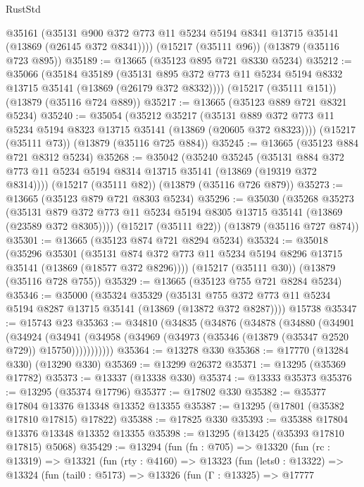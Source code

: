 \begin{lexlean}{RustStd}
\begin{coremodule}
      @35161
      (@35131 @900 @372 @773 @11 @5234 @5194 @8341 @13715 @35141 (@13869 (@26145 @372 @8341))))
    (@15217 (@35111 @96))
    (@13879 (@35116 @723 @895))
@35189 := @13665 (@35123 @895 @721 @8330 @5234)
@35212 := @35066
    (@35184
      @35189
      (@35131 @895 @372 @773 @11 @5234 @5194 @8332 @13715 @35141 (@13869 (@26179 @372 @8332))))
    (@15217 (@35111 @151))
    (@13879 (@35116 @724 @889))
@35217 := @13665 (@35123 @889 @721 @8321 @5234)
@35240 := @35054
    (@35212
      @35217
      (@35131 @889 @372 @773 @11 @5234 @5194 @8323 @13715 @35141 (@13869 (@20605 @372 @8323))))
    (@15217 (@35111 @73))
    (@13879 (@35116 @725 @884))
@35245 := @13665 (@35123 @884 @721 @8312 @5234)
@35268 := @35042
    (@35240
      @35245
      (@35131 @884 @372 @773 @11 @5234 @5194 @8314 @13715 @35141 (@13869 (@19319 @372 @8314))))
    (@15217 (@35111 @82))
    (@13879 (@35116 @726 @879))
@35273 := @13665 (@35123 @879 @721 @8303 @5234)
@35296 := @35030
    (@35268
      @35273
      (@35131 @879 @372 @773 @11 @5234 @5194 @8305 @13715 @35141 (@13869 (@23589 @372 @8305))))
    (@15217 (@35111 @22))
    (@13879 (@35116 @727 @874))
@35301 := @13665 (@35123 @874 @721 @8294 @5234)
@35324 := @35018
    (@35296
      @35301
      (@35131 @874 @372 @773 @11 @5234 @5194 @8296 @13715 @35141 (@13869 (@18577 @372 @8296))))
    (@15217 (@35111 @30))
    (@13879 (@35116 @728 @755))
@35329 := @13665 (@35123 @755 @721 @8284 @5234)
@35346 := @35000
    (@35324
      @35329
      (@35131 @755 @372 @773 @11 @5234 @5194 @8287 @13715 @35141 (@13869 (@13872 @372 @8287))))
    @15738
@35347 := @15743 @23
@35363 := @34810
    (@34835
      (@34876
        (@34878
          (@34880
            (@34901
              (@34924
                (@34941
                  (@34958 (@34969 (@34973 (@35346 (@13879 (@35347 @2520 @729)) @15750)))))))))))
@35364 := @13278 @330
@35368 := @17770 (@13284 @330) (@13290 @330)
@35369 := @13299 @26372
@35371 := @13295 (@35369 @17782)
@35373 := @13337 (@13338 @330)
@35374 := @13333 @35373
@35376 := @13295 (@35374 @17796)
@35377 := @17802 @330
@35382 := @35377 @17804 @13376 @13348 @13352 @13355
@35387 := @13295 (@17801 (@35382 @17810 @17815) @17822)
@35388 := @17825 @330
@35393 := @35388 @17804 @13376 @13348 @13352 @13355
@35398 := @13295 (@13425 (@35393 @17810 @17815) @5068)
@35429 := @13294
    (fun (fn : @705) =>
    @13320
      (fun (rc : @13319) =>
      @13321
        (fun (rty : @4160) =>
        @13323
          (fun (lets0 : @13322) =>
          @13324
            (fun (tail0 : @5173) =>
            @13326
              (fun (Γ : @13325) =>
              @17777

\end{coremodule}
\end{lexlean}
